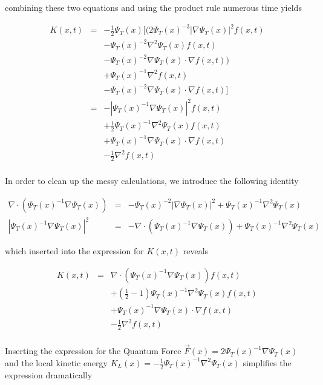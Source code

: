 combining these two equations and using the product rule numerous time yields

\begin{eqnarray*}
K(x, t) &=& -\frac{1}{2}\Psi_T(x)\Big[\big(2\Psi_T(x)^{-3}\left|\nabla\Psi_T(x)\right|^2f(x, t) \\
        & & - \Psi_T(x)^{-2}\nabla^2\Psi_T(x)f(x, t) \\
        & & - \Psi_T(x)^{-2}\nabla\Psi_T(x)\cdot\nabla f(x, t)\big) \\
        & & + \Psi_T(x)^{-1}\nabla^2 f(x, t) \\
        & & - \Psi_T(x)^{-2}\nabla\Psi_T(x)\cdot\nabla f(x, t)\Big] \\
        &=& - \left|\Psi_T(x)^{-1}\nabla\Psi_T(x)\right|^2f(x, t) \\
        & & + \frac{1}{2}\Psi_T(x)^{-1}\nabla^2\Psi_T(x)f(x, t) \\
        & & + \Psi_T(x)^{-1}\nabla\Psi_T(x)\cdot\nabla f(x, t) \\
        & & - \frac{1}{2}\nabla^2 f(x, t) \\
\end{eqnarray*}

In order to clean up the messy calculations, we introduce the following identity

\begin{eqnarray*}
 \nabla\cdot\left(\Psi_T(x)^{-1}\nabla\Psi_T(x)\right) &=& -\Psi_T(x)^{-2}\left|\nabla\Psi_T(x)\right|^2 + \Psi_T(x)^{-1}\nabla^2\Psi_T(x) \\
 \left|\Psi_T(x)^{-1}\nabla\Psi_T(x)\right|^2 &=& -\nabla\cdot\left(\Psi_T(x)^{-1}\nabla\Psi_T(x)\right) + \Psi_T(x)^{-1}\nabla^2\Psi_T(x)
\end{eqnarray*}

which inserted into the expression for $K(x, t)$ reveals

\begin{eqnarray*}
K(x, t) &=&  \nabla\cdot\left(\Psi_T(x)^{-1}\nabla\Psi_T(x)\right)f(x, t) \\
        & & + \left(\frac{1}{2} - 1\right)\Psi_T(x)^{-1}\nabla^2\Psi_T(x)f(x, t) \\
        & & + \Psi_T(x)^{-1}\nabla\Psi_T(x)\cdot\nabla f(x, t) \\
        & & - \frac{1}{2}\nabla^2 f(x, t) \\
\end{eqnarray*}

Inserting the expression for the Quantum Force $\vec F(x) = 2\Psi_T(x)^{-1}\nabla\Psi_T(x)$ and the local kinetic energy $K_L(x) = -\frac{1}{2}\Psi_T(x)^{-1}\nabla^2\Psi_T(x)$ simplifies the expression dramatically

